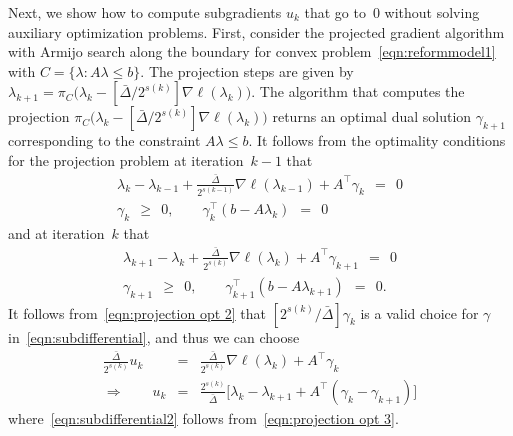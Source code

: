 \documentclass[article]{jss}
\begin{document}
{{}
Next, we show how to compute subgradients $u_{k}$ that go to~$0$ without solving auxiliary optimization problems.
First, consider the projected gradient algorithm with Armijo search along the boundary for convex problem~\eqref{eqn:reformmodel1} with $C = \{\lambda : A \lambda \leq b\}$.
The projection steps are given by $\lambda_{k+1} = \pi_{C}\big(\lambda_{k} - [\bar{\Delta} / 2^{s(k)}] \nabla \ell(\lambda_{k})\Big)$.
The algorithm that computes the projection $\pi_{C}\big(\lambda_{k} - [\bar{\Delta} / 2^{s(k)}] \nabla \ell(\lambda_{k})\Big)$ returns an optimal dual solution $\gamma_{k+1}$ corresponding to the constraint $A \lambda \leq b$.
It follows from the optimality conditions for the projection problem at iteration~$k-1$ that
\begin{eqnarray}
\label{eqn:projection opt 1}
\lambda_{k} - \lambda_{k-1} + \frac{\bar{\Delta}}{2^{s(k-1)}} \nabla \ell(\lambda_{k-1}) + A^{\top} \gamma_{k} \ \ = \ \ 0 \\
\gamma_{k} \ \ \geq \ \ 0, \qquad \gamma_{k}^{\top} (b - A \lambda_{k}) \ \ = \ \ 0
\label{eqn:projection opt 2}
\end{eqnarray}
and at iteration~$k$ that
\begin{eqnarray}
\label{eqn:projection opt 3}
\lambda_{k+1} - \lambda_{k} + \frac{\bar{\Delta}}{2^{s(k)}} \nabla \ell(\lambda_{k}) + A^{\top} \gamma_{k+1} \ \ = \ \ 0 \\
\gamma_{k+1} \ \ \geq \ \ 0, \qquad \gamma_{k+1}^{\top} (b - A \lambda_{k+1}) \ \ = \ \ 0.
\label{eqn:projection opt 4}
\end{eqnarray}
It follows from~\eqref{eqn:projection opt 2} that $[2^{s(k)}/{\bar{\Delta}}] \gamma_{k}$ is a valid choice for $\gamma$ in~\eqref{eqn:subdifferential}, and thus we can choose
\begin{eqnarray}
\frac{\bar{\Delta}}{2^{s(k)}} u_{k} & = & \frac{\bar{\Delta}}{2^{s(k)}} \nabla \ell(\lambda_{k}) + A^{\top} \gamma_{k} \nonumber \\
\Rightarrow \qquad u_{k} & = & \frac{2^{s(k)}}{\bar{\Delta}} \big[\lambda_{k} - \lambda_{k+1} + A^{\top} (\gamma_{k} - \gamma_{k+1})\big]
\label{eqn:subdifferential2}
\end{eqnarray}
where~\eqref{eqn:subdifferential2} follows from~\eqref{eqn:projection opt 3}.
}
\end{document}
